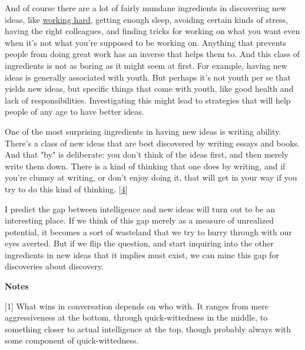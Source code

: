 And of
                  course there are a lot of fairly mundane ingredients in
                  discovering new ideas, like
                  \href{http://www.paulgraham.com/hwh.html}{\underline{working hard}}, getting enough sleep, avoiding certain kinds of stress,
                  having the right colleagues, and finding tricks for working on
                  what you want even when it's not what you're supposed to be
                  working on. Anything that prevents people from doing great
                  work has an inverse that helps them to. And this class of
                  ingredients is not as boring as it might seem at first. For
                  example, having new ideas is generally associated with youth.
                  But perhaps it's not youth per se that yields new ideas, but
                  specific things that come with youth, like good health and
                  lack of responsibilities. Investigating this might lead to
                  strategies that will help people of any age to have better
                  ideas.

One of the most surprising ingredients in
                  having new ideas is writing ability. There's a class of new
                  ideas that are best discovered by writing essays and books.
                  And that "by" is deliberate: you don't think of the ideas
                  first, and then merely write them down. There is a kind of
                  thinking that one does by writing, and if you're clumsy at
                  writing, or don't enjoy doing it, that will get in your way if
                  you try to do this kind of thinking.
                  [\href{\#f4n}{4}]

I predict the gap between intelligence and new
                  ideas will turn out to be an interesting place. If we think of
                  this gap merely as a measure of unrealized potential, it
                  becomes a sort of wasteland that we try to hurry through with
                  our eyes averted. But if we flip the question, and start
                  inquiring into the other ingredients in new ideas that it
                  implies must exist, we can mine this gap for discoveries about
                  discovery.










                  \textbf{Notes}

[1] What wins in conversation depends on who with. It ranges
                  from mere aggressiveness at the bottom, through
                  quick-wittedness in the middle, to something closer to actual
                  intelligence at the top, though probably always with some
                  component of quick-wittedness.

